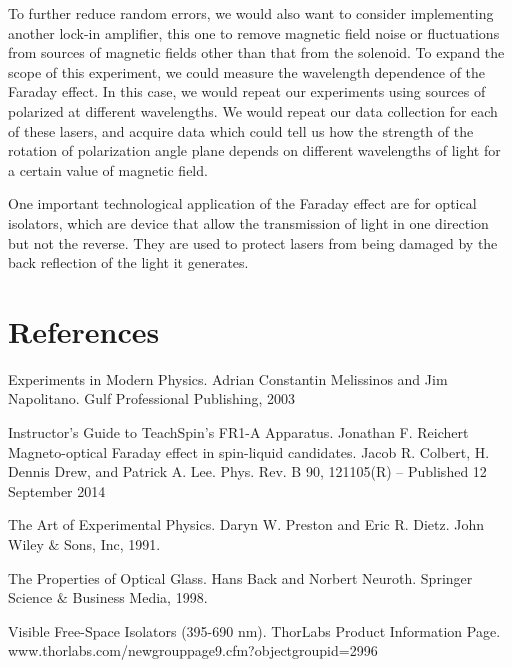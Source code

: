 \documentclass[prb,preprint]{revtex4-1}
\begin{document}
{To further reduce random errors, we would also want to consider implementing another lock-in amplifier, this one to remove magnetic field noise or fluctuations from sources of magnetic fields other than that from the solenoid.  To expand the scope of this experiment, we could measure the wavelength dependence of the Faraday effect.  In this case, we would repeat our experiments using sources of polarized at different wavelengths. We would repeat our data collection for each of these lasers, and acquire data which could tell us how the strength of the rotation of polarization angle plane depends on different wavelengths of light for a certain value of magnetic field.

One important technological application of the Faraday effect are for optical isolators, which are device that allow the transmission of light in one direction but not the reverse. They are used to protect lasers from being damaged by the back reflection of the light it generates\cite{optical}.


}

\section{References}

\begin{thebibliography}{4}
 Experiments in Modern Physics.  Adrian Constantin Melissinos and Jim Napolitano.  Gulf Professional Publishing, 2003

Instructor's Guide to TeachSpin's FR1-A Apparatus.  Jonathan F. Reichert
Magneto-optical Faraday effect in spin-liquid candidates.  Jacob R. Colbert, H. Dennis Drew, and Patrick A. Lee.  Phys. Rev. B 90, 121105(R) – Published 12 September 2014

The Art of Experimental Physics.  Daryn W. Preston and Eric R. Dietz.  John Wiley  $\&$ Sons, Inc, 1991.

 The Properties of Optical Glass.  Hans Back and Norbert Neuroth.  Springer Science $\&$ Business Media, 1998.

 Visible Free-Space Isolators (395-690 nm).  ThorLabs Product Information Page.  www.thorlabs.com/newgrouppage9.cfm?objectgroupid=2996







\end{thebibliography}
\end{document}
